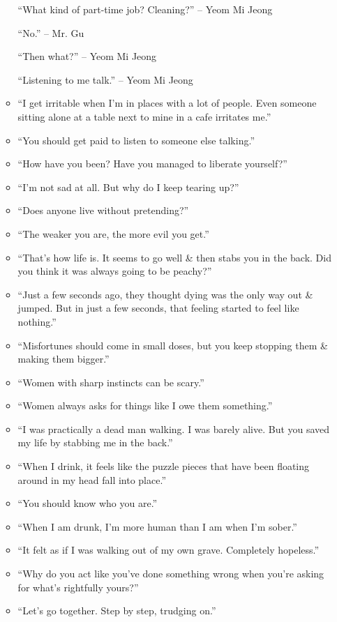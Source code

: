 \documentclass{article}
\numberwithin{equation}{section}
\begin{document}
\begin{enumerate}
\begin{itemize}
		``What kind of part-time job? Cleaning?'' -- Yeom Mi Jeong
		
		``No.'' -- Mr. Gu
		
		``Then what?'' -- Yeom Mi Jeong
		
		``Listening to me talk.'' -- Yeom Mi Jeong
		\item ``I get irritable when I'm in places with a lot of people. Even someone sitting alone at a table next to mine in a cafe irritates me.''
		\item ``You should get paid to listen to someone else talking.''
		\item ``How have you been? Have you managed to liberate yourself?''
		\item ``I'm not sad at all. But why do I keep tearing up?''
		\item ``Does anyone live without pretending?''
		\item ``The weaker you are, the more evil you get.''
		\item ``That's how life is. It seems to go well \& then stabs you in the back. Did you think it was always going to be peachy?''
		\item ``Just a few seconds ago, they thought dying was the only way out \& jumped. But in just a few seconds, that feeling started to feel like nothing.''
		\item ``Misfortunes should come in small doses, but you keep stopping them \& making them bigger.''
		\item ``Women with sharp instincts can be scary.''
		\item ``Women always asks for things like I owe them something.''
		\item ``I was practically a dead man walking. I was barely alive. But you saved my life by stabbing me in the back.''
		\item ``When I drink, it feels like the puzzle pieces that have been floating around in my head fall into place.''
		\item ``You should know who you are.''
		\item ``When I am drunk, I'm more human than I am when I'm sober.''
		\item ``It felt as if I was walking out of my own grave. Completely hopeless.''
		\item ``Why do you act like you've done something wrong when you're asking for what's rightfully yours?''
		\item ``Let's go together. Step by step, trudging on.''
	\end{itemize}

\end{enumerate}
\end{document}
